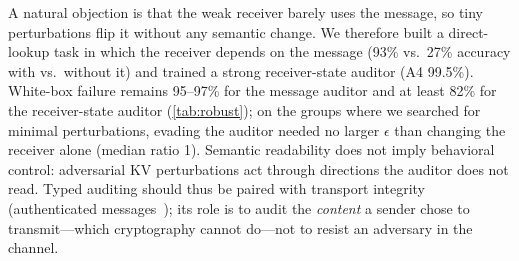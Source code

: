 A natural objection is that the weak receiver barely uses the message, so tiny perturbations flip it without any semantic change. We therefore built a direct-lookup task in which the receiver depends on the message (93\% vs.\ 27\% accuracy with vs.\ without it) and trained a strong receiver-state auditor (A4 99.5\%). White-box failure remains 95--97\% for the message auditor and at least 82\% for the receiver-state auditor (\cref{tab:robust}); on the groups where we searched for minimal perturbations, evading the auditor needed no larger $\epsilon$ than changing the receiver alone (median ratio 1). Semantic readability does not imply behavioral control: adversarial KV perturbations act through directions the auditor does not read. Typed auditing should thus be paired with transport integrity (authenticated messages~\cite{latentlie}); its role is to audit the \emph{content} a sender chose to transmit---which cryptography cannot do---not to resist an adversary in the channel.

